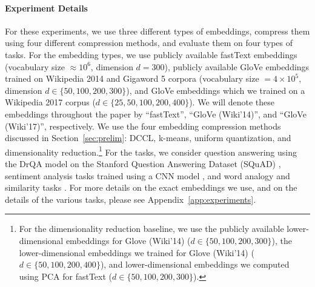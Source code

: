 \paragraph{Experiment Details}
For these experiments, we use three different types of embeddings,
compress them using four different compression methods,
and evaluate them on four types of tasks.
For the embedding types, we use publicly available fastText embeddings (vocabulary size $\approx 10^6$, dimension $d=300$), publicly available GloVe embeddings trained on Wikipedia 2014 and Gigaword 5 corpora (vocabulary size $= 4\times 10^5$, dimension $d \in \{50,100,200,300\}$), and GloVe embeddings which we trained on a Wikipedia 2017 corpus ($d \in \{25,50,100,200,400\}$).
We will denote these embeddings throughout the paper by ``fastText'', ``GloVe (Wiki'14)'', and ``GloVe (Wiki'17)'', respectively.
We use the four embedding compression methods discussed in Section~\ref{sec:prelim}: DCCL, k-means, uniform quantization, and dimensionality reduction.\footnote{For the dimensionality reduction baseline, we use the publicly available lower-dimensional embeddings for Glove (Wiki'14) ($d \in \{50,100,200,300\}$), the lower-dimensional embeddings we trained for Glove (Wiki'14) ($d \in \{50,100,200,400\}$), and lower-dimensional embeddings we computed using PCA for fastText ($d \in \{50,100,200,300\}$). }
For the tasks, we consider question answering using the DrQA model \citep{drqa17} on the Stanford Question Answering Dataset (SQuAD) \citep{squad16}, sentiment analysis tasks trained using a CNN model \citep{kim14}, and word analogy and similarity tasks \citep{levy15}.
For more details on the exact embeddings we use, and on the details of the various tasks, please see Appendix~\ref{app:experiments}.

